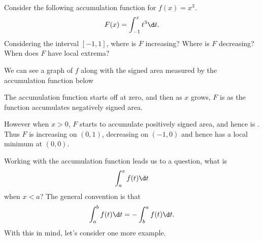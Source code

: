 \documentclass{ximera}
\begin{document}
\begin{example} 
Consider the following accumulation function for $f(x) = x^3$.
\[
F(x) = \int_{-1}^x t^3 \d t.
\]
Considering the interval $[-1,1]$, where is $F$ increasing? Where
is $F$ decreasing? When does $F$ have local extrema?

\begin{explanation}
We can see a graph of $f$ along with the signed area measured by the
accumulation function below
\begin{image}
\end{image}
The accumulation function starts off at zero, and then as $x$ grows,
$F$ is  as
the function accumulates negatively signed area.

However when $x>0$, $F$ starts to accumulate positively signed area,
and hence is
. Thus $F$
is increasing on $(0,1)$, decreasing on $(-1,0)$ and hence has a local
minimum at $(0,0)$.
\end{explanation}
\end{example}

Working with the accumulation function leads us to a question, what is
\[
\int_a^x f(t) \d t
\]
when $x< a$? The general convention is that 
\[
\int_a^b f(t) \d t = -\int_b^a f(t) \d t. 
\]
With this in mind, let's consider one more example.
\end{document}
